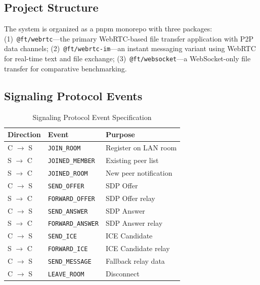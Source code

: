 \documentclass[conference]{IEEEtran}
\begin{document}
\subsection{Project Structure}
The system is organized as a pnpm monorepo with three packages: (1)~\texttt{@ft/webrtc}---the primary WebRTC-based file transfer application with P2P data channels; (2)~\texttt{@ft/webrtc-im}---an instant messaging variant using WebRTC for real-time text and file exchange; (3)~\texttt{@ft/websocket}---a WebSocket-only file transfer for comparative benchmarking.

\subsection{Signaling Protocol Events}

\begin{table}[htbp]
\caption{Signaling Protocol Event Specification}
\label{tab:signalingevents}
\centering
\footnotesize
\begin{tabular}{@{}llp{2cm}@{}}
\toprule
\textbf{Direction} & \textbf{Event} & \textbf{Purpose} \\
\midrule
C $\rightarrow$ S & \texttt{JOIN\_ROOM} & Register on LAN room \\
S $\rightarrow$ C & \texttt{JOINED\_MEMBER} & Existing peer list \\
S $\rightarrow$ C & \texttt{JOINED\_ROOM} & New peer notification \\
C $\rightarrow$ S & \texttt{SEND\_OFFER} & SDP Offer \\
S $\rightarrow$ C & \texttt{FORWARD\_OFFER} & SDP Offer relay \\
C $\rightarrow$ S & \texttt{SEND\_ANSWER} & SDP Answer \\
S $\rightarrow$ C & \texttt{FORWARD\_ANSWER} & SDP Answer relay \\
C $\rightarrow$ S & \texttt{SEND\_ICE} & ICE Candidate \\
S $\rightarrow$ C & \texttt{FORWARD\_ICE} & ICE Candidate relay \\
C $\rightarrow$ S & \texttt{SEND\_MESSAGE} & Fallback relay data \\
C $\rightarrow$ S & \texttt{LEAVE\_ROOM} & Disconnect \\
\bottomrule
\end{tabular}
\end{table}

\end{document}
